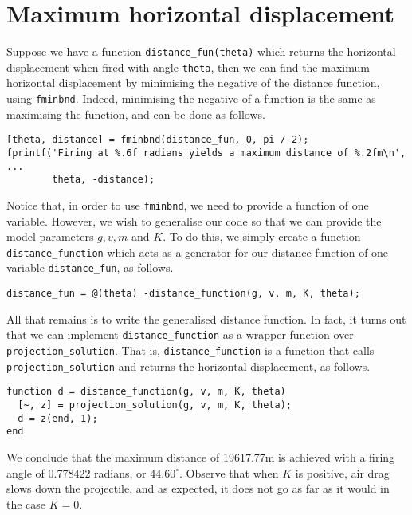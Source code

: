 
\newpage
\section{Maximum horizontal displacement}

Suppose we have a function \lstinline|distance_fun(theta)| which returns the horizontal displacement when fired with angle \lstinline|theta|, then we can find the maximum horizontal displacement by minimising the negative of the distance function, using \lstinline|fminbnd|. Indeed, minimising the negative of a function is the same as maximising the function, and can be done as follows.

\begin{lstlisting}
[theta, distance] = fminbnd(distance_fun, 0, pi / 2);
fprintf('Firing at %.6f radians yields a maximum distance of %.2fm\n', ...
        theta, -distance);
\end{lstlisting}

\noindent
Notice that, in order to use \lstinline|fminbnd|, we need to provide a function of one variable. However, we wish to generalise our code so that we can provide the model parameters $g, v, m$ and $K$. To do this, we simply create a function \lstinline|distance_function| which acts as a generator for our distance function of one variable \lstinline|distance_fun|, as follows.
\begin{lstlisting}
distance_fun = @(theta) -distance_function(g, v, m, K, theta);
\end{lstlisting}

\noindent
All that remains is to write the generalised distance function. In fact, it turns out that we can implement \lstinline|distance_function| as a wrapper function over \lstinline|projection_solution|. That is, \lstinline|distance_function| is a function that calls \lstinline|projection_solution| and returns the horizontal displacement, as follows.
\begin{lstlisting}
function d = distance_function(g, v, m, K, theta)
  [~, z] = projection_solution(g, v, m, K, theta);
  d = z(end, 1);
end
\end{lstlisting}

\noindent
We conclude that the maximum distance of 19617.77m is achieved with a firing angle of 0.778422 radians, or $44.60^\circ$. Observe that when $K$ is positive, air drag slows down the projectile, and as expected, it does not go as far as it would in the case $K = 0$.


